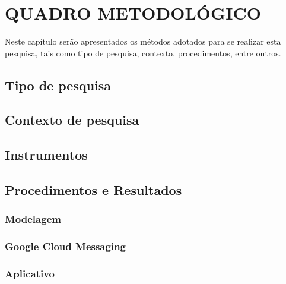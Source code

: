 \chapter{QUADRO METODOLÓGICO}

	\par Neste capítulo serão apresentados os métodos adotados para se realizar
	esta pesquisa, tais como tipo de pesquisa, contexto, procedimentos, entre outros.
	
	\section{Tipo de pesquisa}
		
	
	\section{Contexto de pesquisa}
		
	
	\section{Instrumentos}
		
	
	\section{Procedimentos e Resultados}
		
	
			\subsection{Modelagem}
				
	
			\subsection{Google Cloud Messaging}
				
	
			\subsection{Aplicativo}
				
	
